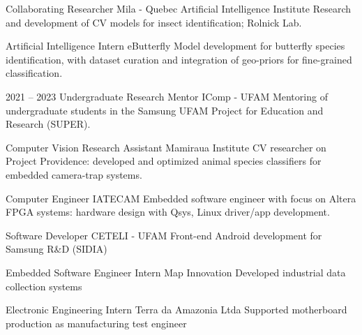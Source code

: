 \documentclass[10pt]{developercv} %
\begin{document}


\begin{entrylist}

  {Collaborating Researcher}
  {Mila - Quebec Artificial Intelligence Institute}
  {Research and development of CV models for insect identification; Rolnick
Lab.}


  {Artificial Intelligence Intern}
  {eButterfly}
  {Model development for butterfly species identification, with dataset curation
and integration of geo-priors for fine-grained classification.}

  \entry
  {2021 -- 2023}
  {Undergraduate Research Mentor}
  {IComp - UFAM}
  {Mentoring of undergraduate students in the Samsung UFAM Project for Education
and Research (SUPER).}

  {Computer Vision Research Assistant}
  {Mamiraua Institute}
  {CV researcher on Project Providence: developed and optimized animal species
classifiers for embedded camera-trap systems.}


  {Computer Engineer}
  {IATECAM}
  {Embedded software engineer with focus on Altera FPGA systems: hardware design
with Qsys, Linux driver/app development.}

  {Software Developer}
  {CETELI - UFAM}
  {Front-end Android development for Samsung R\&D (SIDIA)}

  {Embedded Software Engineer Intern}
  {Map Innovation}
  {Developed industrial data collection systems}

  {Electronic Engineering Intern}
  {Terra da Amazonia Ltda}
  {Supported motherboard production as manufacturing test engineer}
\end{entrylist}

\vspace{1.2cm}

\end{document}
